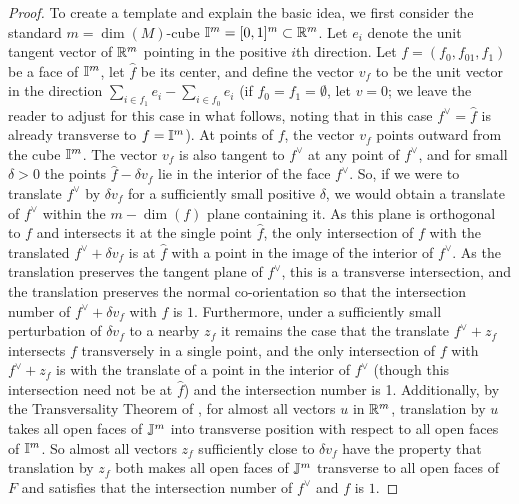 \begin{proof}
	To create a template and explain the basic idea, we first consider the standard $m = \dim(M)$-cube $\mathbb{I}^m = [0,1]^m \subset \mathbb{R}^m$.
	Let $e_i$ denote the unit tangent vector of $\mathbb{R}^m$ pointing in the positive $i$th direction.
	Let $f = (f_0,f_{01},f_1)$ be a face of $\mathbb{I}^m$, let $\hat f$ be its center, and define the vector $v_f$ to be the unit vector in the direction $\sum_{i \in f_1} e_i-\sum_{i \in f_0} e_i$ (if $f_0 = f_1 = \emptyset$, let $v = 0$; we leave the reader to adjust for this case in what follows, noting that in this case $f^\vee = \hat f$ is already transverse to $f = \mathbb{I}^m$).
	At points of $f$, the vector $v_f$ points outward from the cube $\mathbb{I}^m$.
	The vector $v_f$ is also tangent to $f^\vee$ at any point of $f^\vee$, and for small $\delta>0$ the points $\hat f-\delta v_f$ lie in the interior of the face $f^\vee$.
	So, if we were to translate $f^\vee$ by $\delta v_f$ for a sufficiently small positive $\delta$, we would obtain a translate of $f^\vee$ within the $m-\dim(f)$ plane containing it.
	As this plane is orthogonal to $f$ and intersects it at the single point $\hat f$, the only intersection of $f$ with the translated $f^\vee+\delta v_f$ is at $\hat f$ with a point in the image of the interior of $f^\vee$.
	As the translation preserves the tangent plane of $f^\vee$, this is a transverse intersection, and the translation preserves the normal co-orientation so that the intersection number of $f^\vee+\delta v_f$ with $f$ is $1$.
	Furthermore, under a sufficiently small perturbation of $\delta v_f$ to a nearby $z_f$ it remains the case that the translate $f^\vee + z_f$ intersects $f$ transversely in a single point, and the only intersection of $f$ with $f^\vee + z_f$ is with the translate of a point in the interior of $f^\vee$ (though this intersection need not be at $\hat f$) and the intersection number is 1.
	Additionally, by the Transversality Theorem of \cite{GuPo74}, for almost all vectors $u$ in $\mathbb{R}^m$, translation by $u$ takes all open faces of $\mathbb{J}^m$ into transverse position with respect to all open faces of $\mathbb{I}^m$.
	So almost all vectors $z_f$ sufficiently close to $\delta v_f$ have the property that translation by $z_f$ both makes all open faces of $\mathbb{J}^m$ transverse to all open faces of $F$ and satisfies that the intersection number of $f^\vee$ and $f$ is $1$.


\end{proof}
